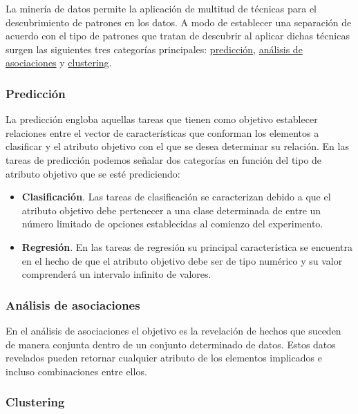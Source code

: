 La minería de datos permite la aplicación de multitud de técnicas para el descubrimiento de patrones en los datos. A modo de establecer una separación de acuerdo con el tipo de patrones que tratan de descubrir al aplicar dichas técnicas surgen las siguientes tres categorías principales: \hyperref[sec:mddprediccion]{predicción}, \hyperref[sec:mddanalisisasociaciones]{análisis de asociaciones} y \hyperref[sec:mddclustering]{clustering}.

\subsubsection{Predicción} \label{sec:mddprediccion}

La predicción engloba aquellas tareas que tienen como objetivo establecer relaciones entre el vector de características que conforman los elementos a clasificar y el atributo objetivo con el que se desea determinar su relación. En las tareas de predicción podemos señalar dos categorías en función del tipo de atributo objetivo que se esté prediciendo:

\vspace{-0.5cm}
\begin{itemize} [\textbullet]
	\item \textbf{Clasificación}. Las tareas de clasificación se caracterizan debido a que el atributo objetivo debe pertenecer a una clase determinada de entre un número limitado de opciones establecidas al comienzo del experimento.
	\item \textbf{Regresión}. En las tareas de regresión su principal característica se encuentra en el hecho de que el atributo objetivo debe ser de tipo numérico y su valor comprenderá un intervalo infinito de valores.
\end{itemize}

\subsubsection{Análisis de asociaciones} \label{sec:mddanalisisasociaciones}

En el análisis de asociaciones el objetivo es la revelación de hechos que suceden de manera conjunta dentro de un conjunto determinado de datos. Estos datos revelados pueden retornar cualquier atributo de los elementos implicados e incluso combinaciones entre ellos.

\subsubsection{Clustering} \label{sec:mddclustering}

